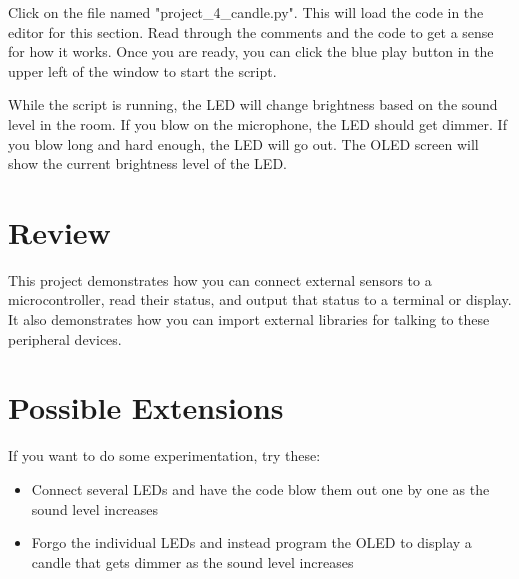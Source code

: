 Click on the file named "project\_4\_candle.py". This will load the code in the editor for this section.
Read through the comments and the code to get a sense for how it works. Once you are ready, you can
click the blue play button in the upper left of the window to start the script.

While the script is running, the LED will change brightness based on the sound level in the room. If
you blow on the microphone, the LED should get dimmer. If you blow long and hard enough, the LED will
go out. The OLED screen will show the current brightness level of the LED.

\section{Review}
This project demonstrates how you can connect external sensors to a microcontroller, read their status,
and output that status to a terminal or display. It also demonstrates how you can import external libraries
for talking to these peripheral devices.

\section{Possible Extensions}
If you want to do some experimentation, try these:

\begin{itemize}
    \item Connect several LEDs and have the code blow them out one by one as the sound level increases
    \item Forgo the individual LEDs and instead program the OLED to display a candle that gets dimmer as the
    sound level increases
\end{itemize}
